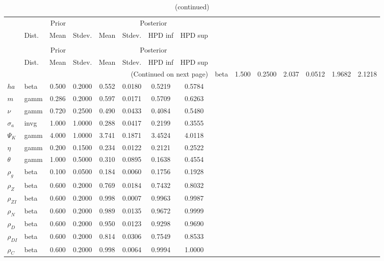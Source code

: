  
\begin{center}
\begin{longtable}{llcccccc} 
\caption{Results from Metropolis-Hastings (parameters)}
 \label{Table:MHPosterior:1}\\
\toprule 
  & \multicolumn{3}{c}{Prior}  &  \multicolumn{4}{c}{Posterior} \\
  \cmidrule(r{.75em}){2-4} \cmidrule(r{.75em}){5-8}
  & Dist. & Mean  & Stdev. & Mean & Stdev. & HPD inf & HPD sup\\
\midrule \endfirsthead 
\caption{(continued)}\\\toprule 
  & \multicolumn{3}{c}{Prior}  &  \multicolumn{4}{c}{Posterior} \\
  \cmidrule(r{.75em}){2-4} \cmidrule(r{.75em}){5-8}
  & Dist. & Mean  & Stdev. & Mean & Stdev. & HPD inf & HPD sup\\
\midrule \endhead 
\bottomrule \multicolumn{8}{r}{(Continued on next page)} \endfoot 
\bottomrule \endlastfoot 
${\gamma}$ & beta &   1.500 & 0.2500 &   2.037& 0.0512 &  1.9682 &  2.1218 \\ 
${ha}$ & beta &   0.500 & 0.2000 &   0.552& 0.0180 &  0.5219 &  0.5784 \\ 
${m}$ & gamm &   0.286 & 0.2000 &   0.597& 0.0171 &  0.5709 &  0.6263 \\ 
$\nu$ & gamm &   0.720 & 0.2500 &   0.490& 0.0433 &  0.4084 &  0.5480 \\ 
${\sigma_a}$ & invg &   1.000 & 1.0000 &   0.288& 0.0417 &  0.2199 &  0.3555 \\ 
${\Psi_K}$ & gamm &   4.000 & 1.0000 &   3.741& 0.1871 &  3.4524 &  4.0118 \\ 
${\eta}$ & gamm &   0.200 & 0.1500 &   0.234& 0.0122 &  0.2121 &  0.2522 \\ 
${\theta}$ & gamm &   1.000 & 0.5000 &   0.310& 0.0895 &  0.1638 &  0.4554 \\ 
${\rho_g}$ & beta &   0.100 & 0.0500 &   0.184& 0.0060 &  0.1756 &  0.1928 \\ 
${\rho_Z}$ & beta &   0.600 & 0.2000 &   0.769& 0.0184 &  0.7432 &  0.8032 \\ 
${\rho_{ZI}}$ & beta &   0.600 & 0.2000 &   0.998& 0.0007 &  0.9963 &  0.9987 \\ 
${\rho_N}$ & beta &   0.600 & 0.2000 &   0.989& 0.0135 &  0.9672 &  0.9999 \\ 
${\rho_D}$ & beta &   0.600 & 0.2000 &   0.950& 0.0123 &  0.9298 &  0.9690 \\ 
${\rho_{DI}}$ & beta &   0.600 & 0.2000 &   0.814& 0.0306 &  0.7549 &  0.8533 \\ 
${\rho_C}$ & beta &   0.600 & 0.2000 &   0.998& 0.0064 &  0.9994 &  1.0000 \\ 
\end{longtable}
 \end{center}
